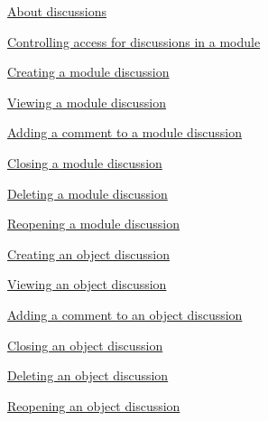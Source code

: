 \documentclass[11pt,a4paper]{article}
\begin{document}
\href{https://www.ibm.com/support/knowledgecenter/search/About%20discussions?scope=SSYQBZ_9.6.1}{About discussions}

\href{https://www.ibm.com/support/knowledgecenter/search/Controlling%20access%20for%20discussions%20in%20a%20module?scope=SSYQBZ_9.6.1}{Controlling access for discussions in a module}

\href{https://www.ibm.com/support/knowledgecenter/search/Creating%20a%20module%20discussion?scope=SSYQBZ_9.6.1}{Creating a module discussion}

\href{https://www.ibm.com/support/knowledgecenter/search/Viewing%20a%20module%20discussion?scope=SSYQBZ_9.6.1}{Viewing a module discussion}

\href{https://www.ibm.com/support/knowledgecenter/search/Adding%20a%20comment%20to%20a%20module%20discussion?scope=SSYQBZ_9.6.1}{Adding a comment to a module discussion}

\href{https://www.ibm.com/support/knowledgecenter/search/Closing%20a%20module%20discussion?scope=SSYQBZ_9.6.1}{Closing a module discussion}

\href{https://www.ibm.com/support/knowledgecenter/search/Deleting%20a%20module%20discussion?scope=SSYQBZ_9.6.1}{Deleting a module discussion}

\href{https://www.ibm.com/support/knowledgecenter/search/Reopening%20a%20module%20discussion?scope=SSYQBZ_9.6.1}{Reopening a module discussion}

\href{https://www.ibm.com/support/knowledgecenter/search/Creating%20an%20object%20discussion?scope=SSYQBZ_9.6.1}{Creating an object discussion}

\href{https://www.ibm.com/support/knowledgecenter/search/Viewing%20an%20object%20discussion?scope=SSYQBZ_9.6.1}{Viewing an object discussion}

\href{https://www.ibm.com/support/knowledgecenter/search/Adding%20a%20comment%20to%20an%20object%20discussion?scope=SSYQBZ_9.6.1}{Adding a comment to an object discussion}

\href{https://www.ibm.com/support/knowledgecenter/search/Closing%20an%20object%20discussion?scope=SSYQBZ_9.6.1}{Closing an object discussion}

\href{https://www.ibm.com/support/knowledgecenter/search/Deleting%20an%20object%20discussion?scope=SSYQBZ_9.6.1}{Deleting an object discussion}

\href{https://www.ibm.com/support/knowledgecenter/search/Reopening%20an%20object%20discussion?scope=SSYQBZ_9.6.1}{Reopening an object discussion} \\
\end{document}
